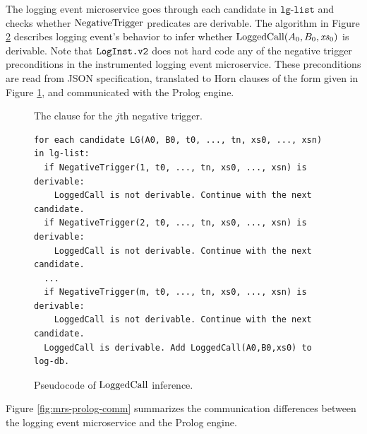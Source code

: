 The logging event microservice goes through each candidate in $\texttt{lg-list}$ and checks whether $\mathrm{NegativeTrigger}$ predicates are derivable. The algorithm in Figure \ref{fig:loggedcall} describes logging event's behavior to infer whether $\mathrm{LoggedCall}(A_0, B_0, \mathit{xs}_0)$ is derivable. Note that $\texttt{LogInst.v2}$ does not hard code any of the negative trigger preconditions in the instrumented logging event microservice. These preconditions are read  from JSON specification, translated to Horn clauses of the form given in Figure \ref{fig:negtrigger}, and communicated with the Prolog engine.

\begin{figure}
\setlength{\fboxsep}{0pt}%
\caption{The clause for the $j$th negative trigger.} 
\label{fig:negtrigger}
\end{figure}



\begin{figure}
\begin{tiny}
\begin{Verbatim}[frame=single]
for each candidate LG(A0, B0, t0, ..., tn, xs0, ..., xsn) in lg-list:
  if NegativeTrigger(1, t0, ..., tn, xs0, ..., xsn) is derivable:
    LoggedCall is not derivable. Continue with the next candidate. 
  if NegativeTrigger(2, t0, ..., tn, xs0, ..., xsn) is derivable:
    LoggedCall is not derivable. Continue with the next candidate. 
  ...
  if NegativeTrigger(m, t0, ..., tn, xs0, ..., xsn) is derivable:
    LoggedCall is not derivable. Continue with the next candidate. 
  LoggedCall is derivable. Add LoggedCall(A0,B0,xs0) to log-db.
\end{Verbatim}
\end{tiny}
\caption{Pseudocode of $\mathrm{LoggedCall}$ inference.}
\label{fig:loggedcall}
\end{figure}


Figure \ref{fig:mrs-prolog-comm} summarizes the communication differences between the logging event microservice and the Prolog engine.

